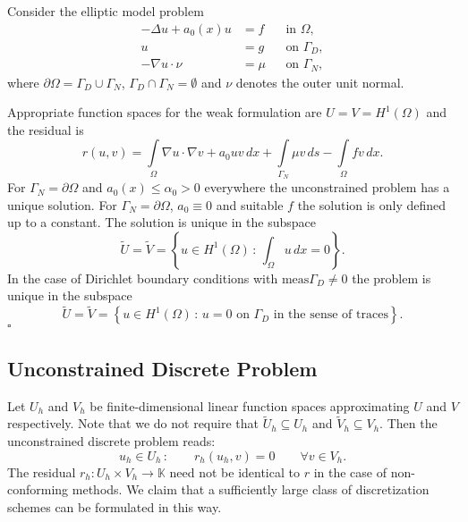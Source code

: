 \begin{Exm}\label{exm:EllipticModelProblem}
Consider the elliptic model problem 
\begin{align*}
-\Delta u + a_0(x) u &= f &&\text{in $\Omega$},\\
u &= g && \text{on $\Gamma_D$},\\
-\nabla u\cdot\nu &= \mu && \text{on $\Gamma_N$},
\end{align*}
where $\partial\Omega = \Gamma_D \cup \Gamma_N$,
$\Gamma_D\cap\Gamma_N=\emptyset$ and $\nu$ denotes the outer unit
normal.

Appropriate function spaces for the weak formulation are $U = V =
H^1(\Omega)$ and the residual is 
\begin{equation*}
r(u,v) = \int\limits_{\Omega} \nabla u \cdot \nabla v + a_0 uv \,dx 
+ \int\limits_{\Gamma_N} \mu v \,ds - \int\limits_{\Omega} fv \,dx.
\end{equation*}
For $\Gamma_N=\partial\Omega$ and $a_0(x)\leq \alpha_0 > 0$ everywhere 
the unconstrained problem has a unique solution. 
For $\Gamma_N=\partial\Omega$, $a_0\equiv 0$ and
suitable $f$ the solution
is only defined up to a constant. The solution is unique in the
subspace
\begin{equation*}
\tilde{U} = \tilde{V} = \left\{ u\in H^1(\Omega) \,:\, 
\int_{\Omega} u \,dx = 0\right\} .
\end{equation*}
In the case of Dirichlet boundary conditions with
$\text{meas}\Gamma_D\neq 0$ the problem is unique in the subspace
\begin{equation*}
\tilde{U} = \tilde{V} = \left\{ u\in H^1(\Omega) \,:\, 
\text{$u = 0$ on $\Gamma_D$ in the sense of traces} \right\} .
\end{equation*}
\hfill$\square$
\end{Exm}

\subsection{Unconstrained Discrete Problem}

Let $U_h$ and $V_h$ be finite-dimensional linear function spaces
approximating $U$ and $V$ respectively. Note that we do not require that
$\tilde{U}_h\subseteq U_h$ and $\tilde{V}_h\subseteq V_h$.  
Then the unconstrained discrete problem reads:
\begin{equation}
u_h\in U_h \,: \qquad r_h(u_h,v) = 0 \qquad \forall v\in V_h .
\end{equation}
The residual $r_h : U_h \times V_h \to \mathbb{K}$ need not be
identical to $r$ in the case of non-conforming methods. 
We claim that a sufficiently large class of discretization schemes can be
formulated in this way.

